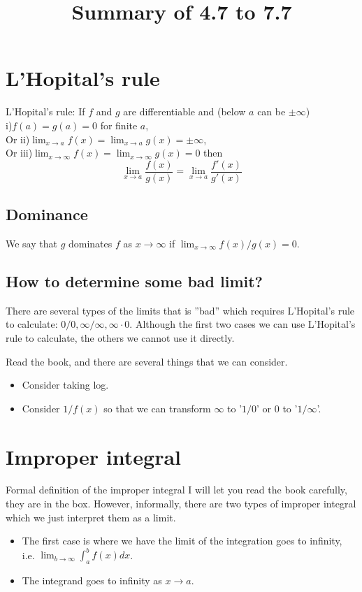 \documentclass[12pt]{article}
\date{}
\title{Summary of 4.7 to 7.7}
\theoremstyle{definition}
\theoremstyle{definition}
\theoremstyle{remark}
\theoremstyle{definition}
\theoremstyle{definition}
\theoremstyle{definition}
\begin{document}
\maketitle

\section{L'Hopital's rule}

L’Hopital’s rule: If $f$ and $g$ are differentiable and (below $a$ can be $\pm \infty$)\\
i)$f(a) = g(a) = 0$ for finite $a$, \\
Or ii)$\lim_{x\to a} f(x)=\lim_{x\to a} g(x)= \pm \infty$,\\ 
Or iii)$\lim_{x\to \infty} f(x)= \lim_{x\to \infty} g(x) = 0$
then 
\[\lim_{x\to a}\frac{f(x)}{g(x)} = \lim_{x\to a} \frac{f'(x)}{g'(x)} \]

\subsection{Dominance}
We say that $g$ dominates $f$ as $x \to \infty$ if $\lim_{x\to \infty}f(x)/g(x) = 0$. 
\subsection{How to determine some bad limit?}

There are several types of the limits that is ''bad'' which requires L'Hopital's rule to calculate:
$0/0, \infty/\infty, \infty\cdot0$. Although the first two cases we can use L'Hopital's rule to calculate, the others we cannot use it directly.

Read the book, and there are several things that we can consider.
\begin{itemize}
	\item Consider taking log.
	\item Consider $1/f(x)$ so that we can transform $\infty$ to '$1/0$' or $0$ to '$1/\infty$'.
\end{itemize}

\section{Improper integral}
Formal definition of the improper integral I will let you read the book carefully, they are in the box. 
However, informally, there are two types of improper integral which we just interpret them as a limit.

\begin{itemize}
	\item The first case is where we have the limit of the integration goes to infinity, i.e. $\lim_{b \to \infty} \int^b_a f(x) dx$.
	\item The integrand goes to infinity as $x \to a$.
\end{itemize}
\end{document}
